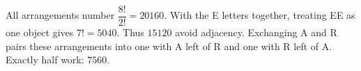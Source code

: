 All arrangements number $\dfrac{8!}{2!}=20160$. With the E letters together, treating EE as one object gives $7!=5040$. Thus $15120$ avoid adjacency. Exchanging A and R pairs these arrangements into one with A left of R and one with R left of A. Exactly half work: $\boxed{7560}$.

